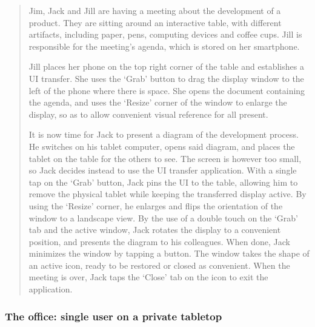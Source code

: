 \begin{quotation}
\small{
Jim, Jack and Jill are having a meeting about the development of a product. 
They are sitting around an interactive table, with different artifacts, including paper, pens, computing devices and coffee cups. 
Jill is responsible for the meeting's agenda, which is stored on her smartphone.

Jill places her phone on the top right corner of the table and establishes a UI transfer. 
She uses the `Grab' button to drag the display window to the left of the phone where there is space. 
She opens the document containing the agenda, and uses the `Resize' corner of the window to enlarge the display, so as to allow convenient visual reference for all present.

It is now time for Jack to present a diagram of the development process. 
He switches on his tablet computer, opens said diagram, and places the tablet on the table for the others to see. 
The screen is however too small, so Jack decides instead to use the UI transfer application. 
With a single tap on the `Grab' button, Jack pins the UI to the table, allowing him to remove the physical tablet while keeping the transferred display active. 
By using the `Resize' corner, he enlarges and flips the orientation of the window to a landscape view. 
By the use of a double touch on the `Grab' tab and the active window, Jack rotates the display to a convenient position, and presents the diagram to his colleagues. 
When done, Jack minimizes the window by tapping a button. 
The window takes the shape of an active icon, ready to be restored or closed as convenient. 
When the meeting is over, Jack taps the `Close' tab on the icon to exit the application.}
\end{quotation}

\subsubsection*{The office: single user on a private tabletop}


